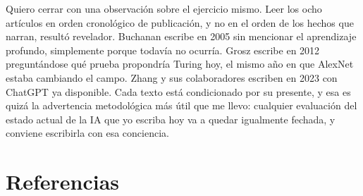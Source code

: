 \documentclass[12pt,letterpaper,oneside]{article}
\begin{document}
Quiero cerrar con una observación sobre el ejercicio mismo. Leer los ocho artículos en orden cronológico de publicación, y no en el orden de los hechos que narran, resultó revelador. Buchanan escribe en 2005 sin mencionar el aprendizaje profundo, simplemente porque todavía no ocurría. Grosz escribe en 2012 preguntándose qué prueba propondría Turing hoy, el mismo año en que AlexNet estaba cambiando el campo. Zhang y sus colaboradores escriben en 2023 con ChatGPT ya disponible. Cada texto está condicionado por su presente, y esa es quizá la advertencia metodológica más útil que me llevo: cualquier evaluación del estado actual de la IA que yo escriba hoy va a quedar igualmente fechada, y conviene escribirla con esa conciencia.


\section{Referencias}
\end{document}
